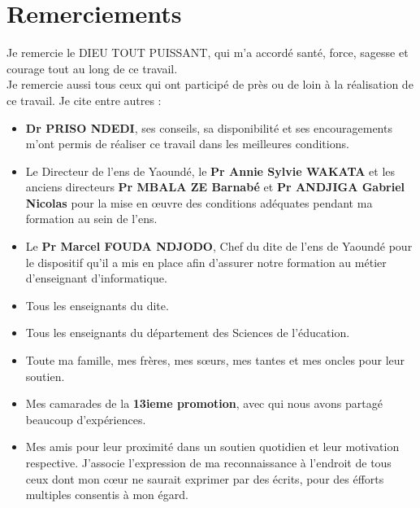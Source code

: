\chapter*{Remerciements}
\hspace{0.65cm}Je remercie le DIEU TOUT PUISSANT, qui m'a accordé santé, force, sagesse et courage tout au long de ce travail. \vspace{0.25cm}\\

Je remercie aussi tous ceux qui ont participé de près ou de loin à la réalisation de ce travail. Je cite entre autres :
\begin{itemize}
	\item \textbf{Dr PRISO NDEDI}, ses conseils, sa disponibilité et ses encouragements m'ont permis de réaliser ce travail dans les meilleures conditions.
  \item Le Directeur de l'\gls{ens} de Yaoundé, le \textbf{Pr Annie Sylvie WAKATA} et les anciens directeurs \textbf{Pr MBALA ZE Barnabé} et \textbf{Pr ANDJIGA Gabriel Nicolas} pour la mise en \oe{}uvre des conditions adéquates pendant ma formation au sein de l'\gls{ens}.
  \item Le \textbf{Pr Marcel FOUDA NDJODO}, Chef du \gls{dite} de l'\gls{ens} de Yaoundé pour le dispositif qu'il a mis en place afin d'assurer notre formation au métier d'enseignant d'informatique.
  \item Tous les enseignants du \gls{dite}.
  \item Tous les enseignants du département des Sciences de l'éducation.
  \item Toute ma famille, mes frères, mes s\oe{}urs, mes tantes et mes oncles pour leur soutien.
  \item Mes camarades de la \textbf{13ieme promotion}, avec qui nous avons partagé beaucoup d’expériences.
  \item Mes amis pour leur proximité dans un soutien quotidien et leur motivation respective. J'associe l'expression de ma reconnaissance à l'endroit de tous ceux dont mon c\oe{}ur ne saurait exprimer par des écrits, pour des éfforts multiples consentis à mon égard.
\end{itemize}
